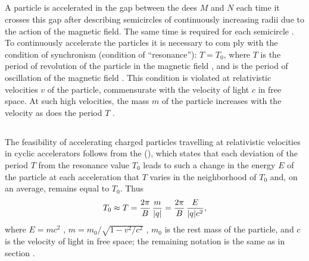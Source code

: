 \subsection{}\label{24.4.6} A particle is accelerated in the gap between the dees $M$ and $N$ each time it crosses this gap after describing semicircles of continuously increasing radii due to the action of the magnetic field. The same time is required for each semicircle . To continuously accelerate the particles it is necessary to com­ ply with the condition of synchronism (condition of ``resonance''): $T = T_{0}$, where $T$ is the period of revolution of the particle in the magnetic field , and is the period of oscillation of the magnetic field . This condition is violated at rel­ativistic velocities $v$ of the particle, commensurate with the velocity of light $c$ in free space. At such high velocities, the mass $m$ of the particle increases with the velocity  as does the period $T$ .

\subsection{}\label{24.4.7} The feasibility of accelerating charged particles travelling at relativistic velocities in cyclic accelerators follows from the  (), which states that each deviation of the period $T$ from the resonance value $T_{0}$  leads to such a change in the energy $E$ of the particle at each acceleration that $T$ varies in the neighborhood of $T_{0}$ and, on an average, remains equal to $T_{0}$. Thus
\begin{equation*}%
T_{0} \approx T = \frac{2\pi}{B} \, \frac{m}{\abs{q}} = \frac{2 \pi}{B} \, \frac{E}{\abs{q} c^{2}},
\end{equation*}
where $E = mc^{2}$ , $m = m_{0}/\sqrt{ 1 - v^{2}/c^{2}}$ , $m_{0}$ is the rest mass  of the particle, and $c$ is the velocity of light in free space; the remaining notation is the same as in section .

